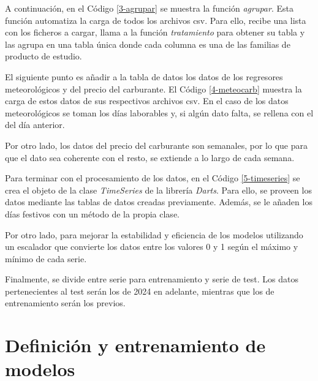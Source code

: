 

A continuación, en el Código \ref*{3-agrupar} se muestra la función \textit{agrupar}. Esta función automatiza la carga de todos los archivos csv. Para ello, recibe una lista con los ficheros a cargar, llama a la función \textit{tratamiento} para obtener su tabla y las agrupa en una tabla única donde cada columna es una de las familias de producto de estudio.



El siguiente punto es añadir a la tabla de datos los datos de los regresores meteorológicos y del precio del carburante. El Código \ref*{4-meteocarb} muestra la carga de estos datos de sus respectivos archivos csv. En el caso de los datos meteorológicos se toman los días laborables y, si algún dato falta, se rellena con el del día anterior.

Por otro lado, los datos del precio del carburante son semanales, por lo que para que el dato sea coherente con el resto, se extiende a lo largo de cada semana.



Para terminar con el procesamiento de los datos, en el Código \ref*{5-timeseries} se crea el objeto de la clase \textit{TimeSeries} de la librería \textit{Darts}. Para ello, se proveen los datos mediante las tablas de datos creadas previamente. Además, se le añaden los días festivos con un método de la propia clase.

Por otro lado, para mejorar la estabilidad y eficiencia de los modelos utilizando un escalador que convierte los datos entre los valores 0 y 1 según el máximo y mínimo de cada serie.

Finalmente, se divide entre serie para entrenamiento y serie de test. Los datos pertenecientes al test serán los de 2024 en adelante, mientras que los de entrenamiento serán los previos.




\section{Definición y entrenamiento de modelos}

